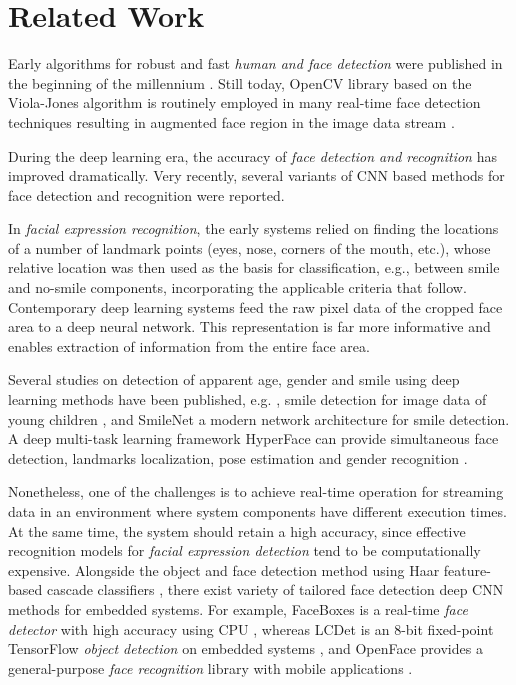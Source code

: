 \documentclass[conference]{IEEEtran}
\begin{document}
\section{Related Work}
\label{sec:related}

Early algorithms for robust and fast \textit{human and face detection} were published in the beginning of the millennium \cite{dalal2005, viola}. Still today, OpenCV library based on the Viola-Jones algorithm \cite{viola} is routinely employed in many real-time face detection techniques resulting in augmented face region in the image data stream \cite{Cha2014, tsai2015, kazanskiy2017, elrefe2017}.


During the deep learning era, the accuracy of \textit{face detection and recognition} has improved dramatically. Very recently, several variants of CNN based methods for face detection \cite{jiang2017, YangLLT17, Mamalet, Farrugia, Garcia} and recognition \cite{hu2015face, byeon2016, arse2017, ChiZC17} were reported.

In \textit{facial expression recognition}, the early systems relied on finding the locations of a number of landmark points (eyes, nose, corners of the mouth, etc.), whose relative location was then used as the basis for classification, e.g., between smile and no-smile components, incorporating the applicable criteria that follow. Contemporary deep learning systems feed the raw pixel data of the cropped face area to a deep neural network. This representation is far more informative and enables extraction of information from the entire face area.

Several studies on detection of apparent age, gender and smile using deep learning methods have been published, e.g. \cite{uri2106}, smile detection for image data of young children \cite{xia2017}, and SmileNet \cite{smilenet} a modern network architecture  for smile detection. A deep multi-task learning framework HyperFace can provide simultaneous face detection, landmarks localization, pose estimation and gender recognition \cite{ranjan2017}.

Nonetheless, one of the challenges is to achieve real-time operation for streaming data in an environment where  system components have different execution times. At the same time, the system should retain a high accuracy, since effective recognition models for \textit{facial expression detection} tend to be computationally expensive. Alongside the object and face detection method using Haar feature-based cascade classifiers \cite{viola}, there exist variety of tailored face detection deep CNN methods for embedded systems. For example, FaceBoxes is a real-time \textit{face detector} with high accuracy using CPU \cite{zhang2017}, whereas LCDet is an 8-bit fixed-point TensorFlow \textit{object detection} on embedded systems \cite{tripathi2017}, and OpenFace provides a general-purpose \textit{face recognition} library with mobile applications \cite{amos2016openface}.
\end{document}
